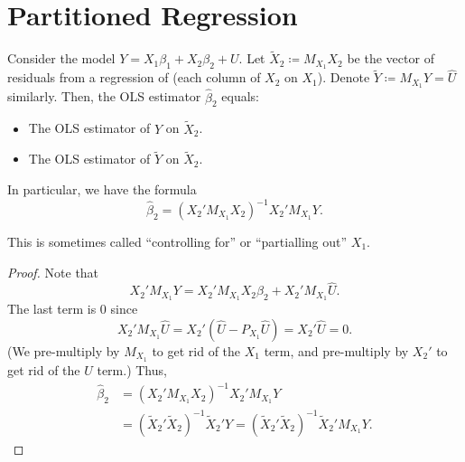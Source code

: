 \documentclass[letterpaper, 10pt]{article}
\begin{document}
\section{Partitioned Regression}
\begin{proposition}
  Consider the model \(Y = X_1 \beta_1 + X_2 \beta_2 + U\).
  Let \(\tilde{X}_2 \coloneqq M_{X_1} X_2\) be the vector of residuals from a regression of (each column of \(X_2\) on \(X_1\)).
  Denote \(\tilde{Y} \coloneqq M_{X_1} Y = \hat{U}\) similarly.
  Then, the OLS estimator \(\hat{\beta}_2\) equals:
  \begin{itemize}
    \item The OLS estimator of \(Y\) on \(\tilde{X}_2\).
    \item The OLS estimator of \(\tilde{Y}\) on \(\tilde{X}_2\).
  \end{itemize}
  In particular, we have the formula
  \[
    \hat{\beta}_2
    = (X_2' M_{X_1} X_2)^{-1} X_2' M_{X_1} Y.
  \]
\end{proposition}
\begin{remark}
  This is sometimes called ``controlling for'' or ``partialling out'' \(X_1\).
\end{remark}
\begin{proof}
  Note that
  \[
    X_2' M_{X_1} Y
    = X_2' M_{X_1} X_2 \beta_2 + X_2' M_{X_1} \hat{U}.
  \]
  The last term is \(0\) since
  \[
    X_2' M_{X_1} \hat{U}
    = X_2' (\hat{U} - P_{X_1} \hat{U})
    = X_2' \hat{U} = 0.
  \]
  (We pre-multiply by \(M_{X_1}\) to get rid of the \(X_1\) term, and pre-multiply by \(X_2'\) to get rid of the \(\hat{U}\) term.)
  Thus,
  \begin{align*}
    \hat{\beta}_2
    &= (X_2' M_{X_1} X_2)^{-1} X_2' M_{X_1} Y \\
    &= (\tilde{X}_2' \tilde{X}_2)^{-1} \tilde{X}_2' Y
    = (\tilde{X}_2' \tilde{X}_2)^{-1} \tilde{X}_2' M_{X_1} Y.
  \end{align*}
\end{proof}
\end{document}
